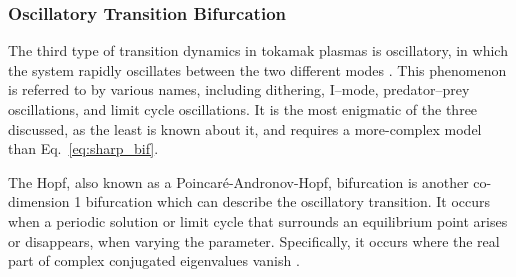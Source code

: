 \subsubsection{Oscillatory Transition Bifurcation}
The third type of transition dynamics in tokamak plasmas is oscillatory, in which the system rapidly oscillates between the two different modes \cite{ryter_survey_2013, zohm_mhd_1995}.
This phenomenon is referred to by various names, including dithering, I--mode, predator--prey oscillations, and limit cycle oscillations.
It is the most enigmatic of the three discussed, as the least is known about it, and requires a more-complex model than Eq.~\ref{eq:sharp_bif}.

The Hopf, also known as a Poincar\'e-Andronov-Hopf, bifurcation is another co-dimension 1 bifurcation which can describe the oscillatory transition.
It occurs when a periodic solution or limit cycle that surrounds an equilibrium point arises or disappears, when varying the parameter.
Specifically, it occurs where the real part of complex conjugated eigenvalues vanish \cite{munoz-alicea_introduction_2011}.

